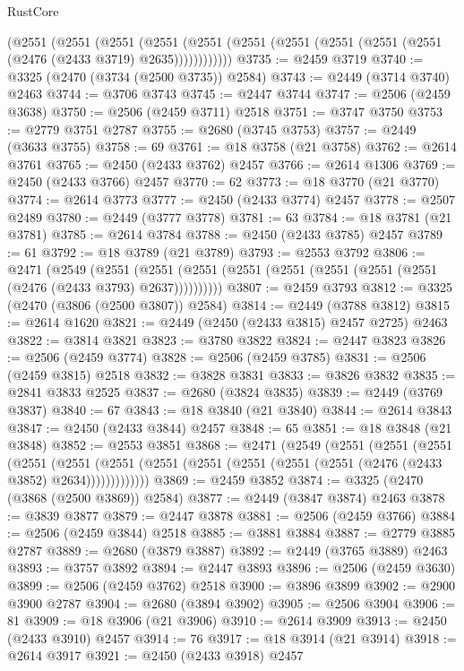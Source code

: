 \begin{lexlean}{RustCore}
\begin{coremodule}
      (@2551
        (@2551
          (@2551
            (@2551 (@2551 (@2551 (@2551 (@2551 (@2551 (@2551 (@2476 (@2433 @3719) @2635))))))))))))
@3735 := @2459 @3719
@3740 := @3325 (@2470 (@3734 (@2500 @3735)) @2584)
@3743 := @2449 (@3714 @3740) @2463
@3744 := @3706 @3743
@3745 := @2447 @3744
@3747 := @2506 (@2459 @3638)
@3750 := @2506 (@2459 @3711) @2518
@3751 := @3747 @3750
@3753 := @2779 @3751 @2787
@3755 := @2680 (@3745 @3753)
@3757 := @2449 (@3633 @3755)
@3758 := 69
@3761 := @18 @3758 (@21 @3758)
@3762 := @2614 @3761
@3765 := @2450 (@2433 @3762) @2457
@3766 := @2614 @1306
@3769 := @2450 (@2433 @3766) @2457
@3770 := 62
@3773 := @18 @3770 (@21 @3770)
@3774 := @2614 @3773
@3777 := @2450 (@2433 @3774) @2457
@3778 := @2507 @2489
@3780 := @2449 (@3777 @3778)
@3781 := 63
@3784 := @18 @3781 (@21 @3781)
@3785 := @2614 @3784
@3788 := @2450 (@2433 @3785) @2457
@3789 := 61
@3792 := @18 @3789 (@21 @3789)
@3793 := @2553 @3792
@3806 := @2471
    (@2549
      (@2551 (@2551 (@2551 (@2551 (@2551 (@2551 (@2551 (@2551 (@2476 (@2433 @3793) @2637))))))))))
@3807 := @2459 @3793
@3812 := @3325 (@2470 (@3806 (@2500 @3807)) @2584)
@3814 := @2449 (@3788 @3812)
@3815 := @2614 @1620
@3821 := @2449 (@2450 (@2433 @3815) @2457 @2725) @2463
@3822 := @3814 @3821
@3823 := @3780 @3822
@3824 := @2447 @3823
@3826 := @2506 (@2459 @3774)
@3828 := @2506 (@2459 @3785)
@3831 := @2506 (@2459 @3815) @2518
@3832 := @3828 @3831
@3833 := @3826 @3832
@3835 := @2841 @3833 @2525
@3837 := @2680 (@3824 @3835)
@3839 := @2449 (@3769 @3837)
@3840 := 67
@3843 := @18 @3840 (@21 @3840)
@3844 := @2614 @3843
@3847 := @2450 (@2433 @3844) @2457
@3848 := 65
@3851 := @18 @3848 (@21 @3848)
@3852 := @2553 @3851
@3868 := @2471
    (@2549
      (@2551
        (@2551
          (@2551
            (@2551
              (@2551
                (@2551 (@2551 (@2551 (@2551 (@2551 (@2551 (@2476 (@2433 @3852) @2634)))))))))))))
@3869 := @2459 @3852
@3874 := @3325 (@2470 (@3868 (@2500 @3869)) @2584)
@3877 := @2449 (@3847 @3874) @2463
@3878 := @3839 @3877
@3879 := @2447 @3878
@3881 := @2506 (@2459 @3766)
@3884 := @2506 (@2459 @3844) @2518
@3885 := @3881 @3884
@3887 := @2779 @3885 @2787
@3889 := @2680 (@3879 @3887)
@3892 := @2449 (@3765 @3889) @2463
@3893 := @3757 @3892
@3894 := @2447 @3893
@3896 := @2506 (@2459 @3630)
@3899 := @2506 (@2459 @3762) @2518
@3900 := @3896 @3899
@3902 := @2900 @3900 @2787
@3904 := @2680 (@3894 @3902)
@3905 := @2506 @3904
@3906 := 81
@3909 := @18 @3906 (@21 @3906)
@3910 := @2614 @3909
@3913 := @2450 (@2433 @3910) @2457
@3914 := 76
@3917 := @18 @3914 (@21 @3914)
@3918 := @2614 @3917
@3921 := @2450 (@2433 @3918) @2457

\end{coremodule}
\end{lexlean}
